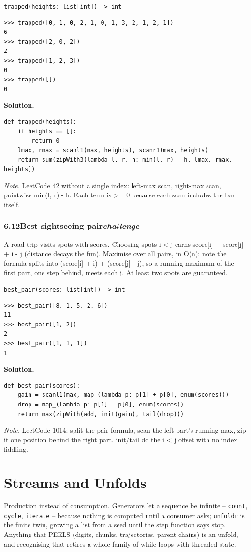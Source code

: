 \documentclass[10pt,letterpaper]{book}
\begin{document}
\noindent\texttt{trapped(heights: list[int]) -> int}
\begin{lstlisting}[style=ex]
>>> trapped([0, 1, 0, 2, 1, 0, 1, 3, 2, 1, 2, 1])
6
>>> trapped([2, 0, 2])
2
>>> trapped([1, 2, 3])
0
>>> trapped([])
0
\end{lstlisting}
\noindent\textbf{Solution.}
\begin{lstlisting}[style=code]
def trapped(heights):
    if heights == []:
        return 0
    lmax, rmax = scanl1(max, heights), scanr1(max, heights)
    return sum(zipWith3(lambda l, r, h: min(l, r) - h, lmax, rmax, heights))
\end{lstlisting}
\noindent\textit{Note.} LeetCode 42 without a single index: left-max scan, right-max scan, pointwise min(l, r) - h. Each term is >= 0 because each scan includes the bar itself.

\subsection*{6.12\quad Best sightseeing pair\hfill\textnormal{\textit{challenge}}}
A road trip visits spots with scores. Choosing spots i < j earns score[i] + score[j] + i - j (distance decays the fun). Maximise over all pairs, in O(n): note the formula splits into (score[i] + i) + (score[j] - j), so a running maximum of the first part, one step behind, meets each j. At least two spots are guaranteed.

\noindent\texttt{best\_pair(scores: list[int]) -> int}
\begin{lstlisting}[style=ex]
>>> best_pair([8, 1, 5, 2, 6])
11
>>> best_pair([1, 2])
2
>>> best_pair([1, 1, 1])
1
\end{lstlisting}
\noindent\textbf{Solution.}
\begin{lstlisting}[style=code]
def best_pair(scores):
    gain = scanl1(max, map_(lambda p: p[1] + p[0], enum(scores)))
    drop = map_(lambda p: p[1] - p[0], enum(scores))
    return max(zipWith(add, init(gain), tail(drop)))
\end{lstlisting}
\noindent\textit{Note.} LeetCode 1014: split the pair formula, scan the left part's running max, zip it one position behind the right part. init/tail do the i < j offset with no index fiddling.

\clearpage
\chapter{Streams and Unfolds}

Production instead of consumption. Generators let a sequence be infinite --
\texttt{count}, \texttt{cycle}, \texttt{iterate} -- because nothing is
computed until a consumer asks; \texttt{unfoldr} is the finite twin, growing
a list from a seed until the step function says stop. Anything that PEELS
(digits, chunks, trajectories, parent chains) is an unfold, and recognising
that retires a whole family of while-loops with threaded state.
\end{document}
